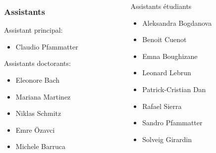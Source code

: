    \begin{frame}

     \begin{columns}
       \begin{column}{0.4\textwidth }                 
     \frametitle{Assistants}
     Assistant principal:
     \begin{itemize}
     \item Claudio Pfammatter 
     \end{itemize}

     \bigskip 
     
     Assistants doctorants:
     \begin{itemize}

     \item Eleonore Bach \item Mariana Martinez \item  Niklas Schmitz \item  Emre Özavci \item Michele Barruca 
     \end{itemize}
   \end{column}
   \begin{column}{0.6\textwidth }         
     Assistants étudiants      
     \begin{itemize}\item 
       Aleksandra Bogdanova 
     \item Benoit Cuenot 
     \item Emna Boughizane
     \item Leonard Lebrun
     \item  Patrick-Cristian Dan
     \item Rafael Sierra 
     \item Sandro Pfammatter
     \item Solveig Girardin
     \end{itemize}
   \end{column}
   
\end{columns}
\end{frame}

